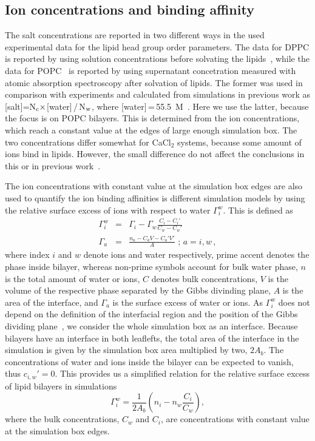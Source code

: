 \documentclass[aip,jcp,twocolumn]{revtex4}
\begin{document}
\subsection{Ion concentrations and binding affinity}
The salt concentrations are reported in two different ways
in the used experimental data for the lipid head group order
parameters. The data for DPPC is reported
by using solution concentrations before solvating
the lipids~\cite{akutsu81}, while the data
for POPC~\cite{altenbach84} is reported by using
supernatant concetration measured with atomic absorption
spectroscopy after solvation of lipids.
The former was used in comparison with experiments and
calculated from simulations in previous work as 
[salt]=N$_{\rm c} \times$[water]\,/\,N$_{\rm w}$, where [water]\,=\,55.5~M~\cite{catte16}.
Here we use the latter, because the focus is on POPC bilayers.
This is determined from the ion concentrations, which reach
a constant value at the edges of large enough simulation box.
The two concentrations differ somewhat for CaCl$_2$ systems, because some
amount of ions bind in lipids. However, the small difference do
not affect the conclusions in this or in previous work~\cite{catte16}. 

The ion concentrations with constant value at the simulation box edges
are also used to quantify the ion binding affinities is different simulation
models by using the relative surface excess of ions with respect to water $\Gamma_i^w$.
This is defined as \cite{chattorajBOOK}
\begin{eqnarray}
  \Gamma_i^w   &=& \Gamma_i-\Gamma_w \frac{C_i-C_i'}{C_w-C_w'} \\
  \Gamma_{a} &=& \frac{n_{a} - C_{a} V - C_{a}' V'}{A} \, \, ; \, a=i,w \, ,
\end{eqnarray}
where index $i$ and $w$ denote ions and water respectively,
prime accent denotes the phase inside bilayer, 
whereas non-prime symbols account for bulk water phase,
$n$ is the total amount of water or ions,
$C$ denotes bulk concentrations, 
$V$ is the volume of the respective phase separated by the Gibbs divinding plane, 
$A$ is the area of the interface, 
and $\Gamma_a$ is the surface excess of water or ions. 
As $\Gamma_i^w$ does not depend on the definition of the interfacial region
and the position of the Gibbs dividing plane~\cite{chattorajBOOK},
we consider the whole simulation box as an interface. 
Because bilayers have an interface
in both leaflefts,
the total area of the interface in the simulation
 is given by the simulation box area multiplied by two, $2A_b$.
The concentrations of water and ions inside
the bilayer can be expected to vanish, thus $c_{i,w}'=0$.
This provides us a simplified relation for 
the relative surface excess of lipid bilayers in simulations
\begin{equation}\label{surfexcess}
  \Gamma_i^w=\frac{1}{2A_b} \left ( n_i - n_w \frac{C_i}{C_w} \right ) ,
\end{equation}
where the bulk concentrations, $C_w$ and $C_i$, are 
concentrations with constant value at the simulation box edges.
\end{document}

